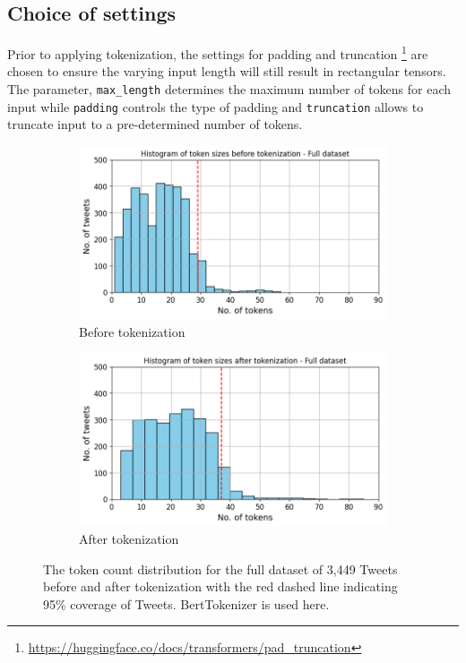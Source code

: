\subsection{Choice of settings}
Prior to applying tokenization, the settings for padding and truncation \footnote{\url{https://huggingface.co/docs/transformers/pad_truncation}} are chosen to ensure the varying input length will still result in rectangular tensors. The parameter, \texttt{max\_length} determines the maximum number of tokens for each input while \texttt{padding} controls the type of padding and \texttt{truncation} allows to truncate input to a pre-determined number of tokens.\newline

\begin{figure}[htbp]
    \centering
    \captionsetup{font=small}
    \begin{subfigure}[b]{0.48\textwidth}
        \includegraphics[width=\textwidth]{figures/token_hist.png}
        \caption{Before tokenization}
        \label{fig: token_hist}
    \end{subfigure}
    \hfill
    \begin{subfigure}[b]{0.48\textwidth}
        \includegraphics[width=\textwidth]{figures/token_pp_hist.png}
        \caption{After tokenization}
        \label{fig: token_pp_hist}
    \end{subfigure}
    \caption{The token count distribution for the full dataset of 3,449 Tweets before and after tokenization with the red dashed line indicating 95\% coverage of Tweets. BertTokenizer is used here.}
    \label{fig: bef_aft_token}
\end{figure}

